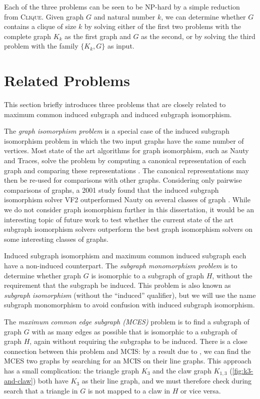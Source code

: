 Each of the three problems can be seen to be NP-hard by a simple reduction from \textsc{Clique}.
Given graph $G$ and natural number $k$, we can determine whether $G$ contains a clique
of size $k$ by solving either of the first two problems with the complete graph $K_k$ as
the first graph and $G$ as the second, or by solving the third problem with the family
$\{K_k, G\}$ as input.

\section{Related Problems}

This section briefly introduces three problems that are closely related to
maximum common induced subgraph and induced subgraph isomorphism.

The \emph{graph isomorphism problem} is a special case of the induced subgraph
isomorphism problem in which the two input graphs have the same number of
vertices.  Most state of the art algorithms for graph isomorphism, such as
Nauty and Traces, solve the problem by computing a canonical representation of
each graph and comparing these representations \citep{McKay201494}.  The
canonical representations may then be re-used for comparisons with other
graphs.  Considering only pairwise comparisons of graphs, a 2001 study found
that the induced subgraph isomorphism solver VF2 outperformed Nauty on several
classes of graph \citep{foggia2001performance}.  While we do not consider graph
isomorphism further in this dissertation, it would be an interesting topic of
future work to test whether the current state of the art subgraph isomorphism
solvers outperform the best graph isomorphism solvers on some interesting
classes of graphs.

Induced subgraph isomorphism and maximum common induced subgraph each have a
non-induced counterpart. The \emph{subgraph monomorphism problem} is to determine
whether graph $G$ is isomorphic to a subgraph of graph $H$, without the requirement
that the subgraph be induced.
This problem is also known as \emph{subgraph isomorphism} (without
the ``induced'' qualifier), but we will use the name subgraph monomorphism
to avoid confusion with induced subgraph isomorphism.

The \emph{maximum common edge subgraph (MCES)} problem is to find a subgraph of
graph $G$ with as many edges as possible that is isomorphic to a subgraph of
graph $H$, again without requiring the subgraphs to be induced.
There is a close connection between this problem and MCIS: by a
result due to \citet{whitney1932congruent}, we can find the MCES two
graphs by searching for an MCIS on their line graphs.  This approach has a
small complication: the triangle graph $K_3$ and the claw graph $K_{1,3}$
(\cref{fig:k3-and-claw}) both have $K_3$ as their line graph, and we must
therefore check during search that a triangle in $G$ is not mapped to a claw
in $H$ or vice versa.

